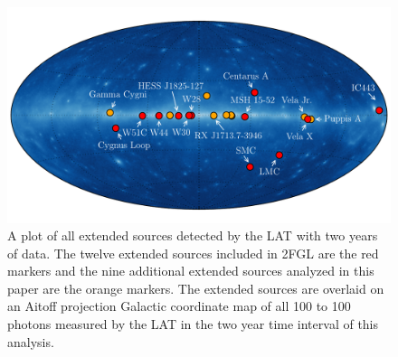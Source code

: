 \documentclass[12pt,preprint]{aastex}
\newcommand{\mev}{\text{MeV}\xspace}
\newcommand{\gev}{\text{GeV}\xspace}
\begin{document}
\clearpage
\begin{figure}
  \begin{center}
    \includegraphics{summary_plots/allsky_extended_sources.pdf}
    \end{center}
    \caption{A plot of all \gev extended sources detected by the LAT
    with two years of data.  The twelve extended sources included in
    2FGL are the red markers and the nine additional
    extended sources analyzed in this paper are the orange markers. The
    extended sources are overlaid on an Aitoff projection Galactic
    coordinate map of all 100 \mev to 100 \gev photons measured by the
    LAT in the two year time interval of this analysis.
    }\label{allsky_extended_sources}
  \end{figure}
\end{document}
